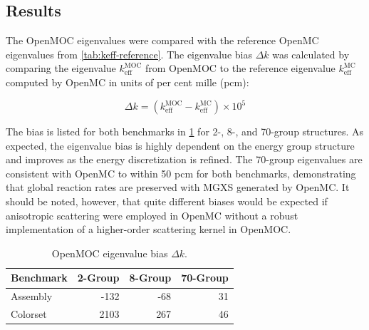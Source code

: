 \subsection{Results}
\label{subsec:results}

The OpenMOC eigenvalues were compared with the reference OpenMC eigenvalues from \cref{tab:keff-reference}. The eigenvalue bias $\Delta k$ was calculated by comparing the eigenvalue $k_{\textrm{eff}}^{\textrm{MOC}}$ from OpenMOC to the reference eigenvalue $k_{\textrm{eff}}^{\textrm{MC}}$ computed by OpenMC in units of per cent mille (pcm):

\begin{equation}
\label{eqn:delta-rho}
\Delta k = \left(k_{\textrm{eff}}^{\textrm{MOC}} - k_{\textrm{eff}}^{\textrm{MC}}\right) \times 10^{5}
\end{equation}

The bias is listed for both benchmarks in \cref{tab:keff-bias} for 2-, 8-, and 70-group structures. As expected, the eigenvalue bias is highly dependent on the energy group structure and improves as the energy discretization is refined. The 70-group eigenvalues are consistent with OpenMC to within 50 pcm for both benchmarks, demonstrating that global reaction rates are preserved with MGXS generated by OpenMC. It should be noted, however, that quite different biases would be expected if anisotropic scattering were employed in OpenMC without a robust implementation of a higher-order scattering kernel in OpenMOC.

\begin{table}[h!]
  \centering
  \caption{OpenMOC eigenvalue bias $\Delta k$.}
  \label{tab:keff-bias}
  \begin{tabular}{l r r r}
  \toprule
  \textbf{Benchmark} & \textbf{2-Group} & \textbf{8-Group} & \textbf{70-Group} \\
  \midrule
  Assembly & -132 & -68 & 31 \\
  \midrule
  Colorset & 2103 & 267 & 46 \\
  \bottomrule
\end{tabular}
\end{table}

